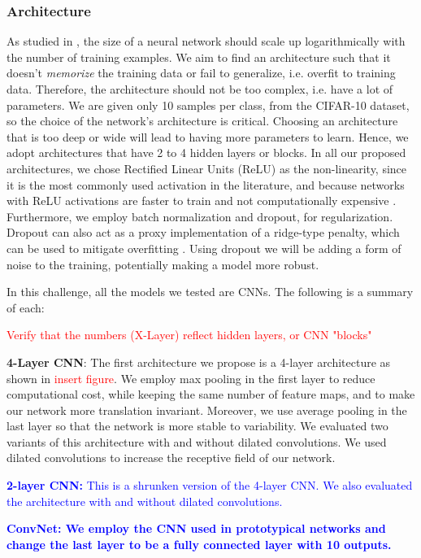 \documentclass[a4paper,11pt]{article}
\begin{document}
\subsubsection{Architecture}
As studied in \cite{sun17}, the size of a neural network should scale up logarithmically with the number of training examples. We aim to find an architecture such that it doesn't \textit{memorize} the training data or fail to generalize, i.e. overfit to training data. Therefore, the architecture should not be too complex, i.e. have a lot of parameters. We are given only 10 samples per class, from the CIFAR-10 dataset, so the choice of the network's architecture is critical. Choosing an architecture that is too deep or wide will lead to having more parameters to learn. Hence, we adopt architectures that have 2 to 4 hidden layers or blocks. In all our proposed architectures, we chose Rectified Linear Units (ReLU) as the non-linearity, since it is the most commonly used activation in the literature, and because networks with ReLU activations are faster to train and not computationally expensive \cite{krizhevsky2012imagenet}. Furthermore, we employ batch normalization and dropout, for regularization. Dropout can also act as a proxy implementation of a ridge-type penalty, which can be used to mitigate overfitting \cite{olson2018modern}. Using dropout we will be adding a form of noise to the training, potentially making a model more robust.

In this challenge, all the models we tested are CNNs. The following is a summary of each:

\textcolor{red}{Verify that the numbers (X-Layer) reflect hidden layers, or CNN "blocks"}

\textbf{4-Layer CNN}: The first architecture we propose is a 4-layer architecture as shown in \textcolor{red}{insert figure}. We employ max pooling in the first layer to reduce computational cost, while keeping the same number of feature maps, and to make our network more translation invariant. Moreover, we use average pooling in the last layer so that the network is more stable to variability. We evaluated two variants of this architecture with and without dilated convolutions. We used dilated convolutions to increase the receptive field of our network.

\textcolor{blue}{\textbf{2-layer CNN:}
This is a shrunken version of the 4-layer CNN. We also evaluated the architecture with and without dilated convolutions.}

\textcolor{blue}{\textbf{ConvNet: We employ the CNN used in prototypical networks \cite{snell2017prototypical} and change the last layer to be a fully connected layer with 10 outputs.}}
\end{document}
